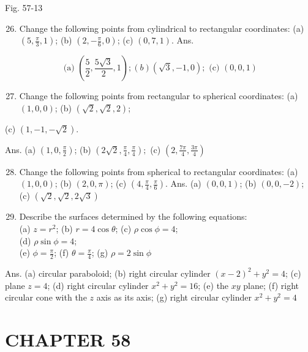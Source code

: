 \documentclass[10pt]{article}
\begin{document}
Fig. 57-13

\begin{enumerate}
  \setcounter{enumi}{25}
  \item Change the following points from cylindrical to rectangular coordinates: (a) $\left(5, \frac{\pi}{3}, 1\right)$; (b) $\left(2,-\frac{\pi}{6}, 0\right)$; (c) $(0,7,1)$. Ans.
\end{enumerate}

$$
\text { (a) }\left(\frac{5}{2}, \frac{5 \sqrt{3}}{2}, 1\right) ;(b)(\sqrt{3},-1,0) ; \text { (c) }(0,0,1)
$$

\begin{enumerate}
  \setcounter{enumi}{26}
  \item Change the following points from rectangular to spherical coordinates: (a) $(1,0,0)$; (b) $(\sqrt{2}, \sqrt{2}, 2)$;
\end{enumerate}

(c) $(1,-1,-\sqrt{2})$.

Ans. (a) $\left(1,0, \frac{\pi}{2}\right)$; (b) $\left(2 \sqrt{2}, \frac{\pi}{4}, \frac{\pi}{4}\right) ;$ (c) $\left(2, \frac{7 \pi}{4}, \frac{3 \pi}{4}\right)$

\begin{enumerate}
  \setcounter{enumi}{27}
  \item Change the following points from spherical to rectangular coordinates: (a) $(1,0,0)$; (b) $(2,0, \pi)$; (c) $\left(4, \frac{\pi}{4}, \frac{\pi}{6}\right)$. Ans. (a) $(0,0,1)$; (b) $(0,0,-2)$; (c) $(\sqrt{2}, \sqrt{2}, 2 \sqrt{3})$

  \item Describe the surfaces determined by the following equations:\\
(a) $z=r^{2}$; (b) $r=4 \cos \theta$; (c) $\rho \cos \phi=4$;\\
(d) $\rho \sin \phi=4$;\\
(e) $\phi=\frac{\pi}{2}$; (f) $\theta=\frac{\pi}{4}$; (g) $\rho=2 \sin \phi$

\end{enumerate}

Ans. (a) circular paraboloid; (b) right circular cylinder $(x-2)^{2}+y^{2}=4$; (c) plane $z=4$; (d) right circular cylinder $x^{2}+y^{2}=16$; (e) the $x y$ plane; (f) right circular cone with the $z$ axis as its axis; (g) right circular cylinder $x^{2}+y^{2}=4$

\section*{CHAPTER 58}
\end{document}
